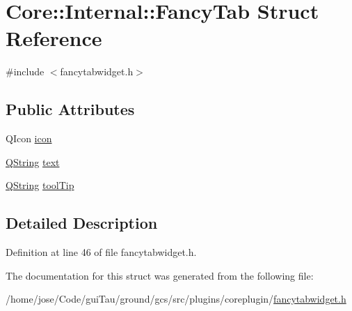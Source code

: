 \hypertarget{struct_core_1_1_internal_1_1_fancy_tab}{\section{Core\-:\-:Internal\-:\-:Fancy\-Tab Struct Reference}
\label{struct_core_1_1_internal_1_1_fancy_tab}
}


{\ttfamily \#include $<$fancytabwidget.\-h$>$}

\subsection*{Public Attributes}
\begin{DoxyCompactItemize}
\item 
Q\-Icon \hyperlink{group___core_plugin_gac279f1fc22813550a7b753d5c706bab6}{icon}
\item 
\hyperlink{group___u_a_v_objects_plugin_gab9d252f49c333c94a72f97ce3105a32d}{Q\-String} \hyperlink{group___core_plugin_ga69dfe64d44267cdfafa4682161bd6961}{text}
\item 
\hyperlink{group___u_a_v_objects_plugin_gab9d252f49c333c94a72f97ce3105a32d}{Q\-String} \hyperlink{group___core_plugin_gae38200de3f958b2986cadd6ec675fe07}{tool\-Tip}
\end{DoxyCompactItemize}


\subsection{Detailed Description}


Definition at line 46 of file fancytabwidget.\-h.



The documentation for this struct was generated from the following file\-:\begin{DoxyCompactItemize}
\item 
/home/jose/\-Code/gui\-Tau/ground/gcs/src/plugins/coreplugin/\hyperlink{coreplugin_2fancytabwidget_8h}{fancytabwidget.\-h}\end{DoxyCompactItemize}
